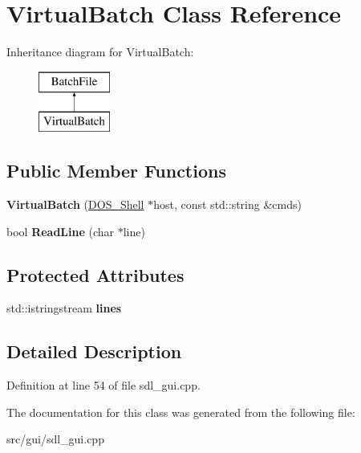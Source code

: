 \hypertarget{classVirtualBatch}{\section{Virtual\-Batch Class Reference}
\label{classVirtualBatch}
}
Inheritance diagram for Virtual\-Batch\-:\begin{figure}[H]
\begin{center}
\leavevmode
\includegraphics[height=2.000000cm]{classVirtualBatch}
\end{center}
\end{figure}
\subsection*{Public Member Functions}
\begin{DoxyCompactItemize}
\item 
\hypertarget{classVirtualBatch_ae7d064d0fd0b8ef53b344eb8239ec41f}{{\bfseries Virtual\-Batch} (\hyperlink{classDOS__Shell}{D\-O\-S\-\_\-\-Shell} $\ast$host, const std\-::string \&cmds)}\label{classVirtualBatch_ae7d064d0fd0b8ef53b344eb8239ec41f}

\item 
\hypertarget{classVirtualBatch_a2d5e383678a9a43bd5d0ac5753279fba}{bool {\bfseries Read\-Line} (char $\ast$line)}\label{classVirtualBatch_a2d5e383678a9a43bd5d0ac5753279fba}

\end{DoxyCompactItemize}
\subsection*{Protected Attributes}
\begin{DoxyCompactItemize}
\item 
\hypertarget{classVirtualBatch_ad920a5d596d8cc0372e8eb1e6512448e}{std\-::istringstream {\bfseries lines}}\label{classVirtualBatch_ad920a5d596d8cc0372e8eb1e6512448e}

\end{DoxyCompactItemize}


\subsection{Detailed Description}


Definition at line 54 of file sdl\-\_\-gui.\-cpp.



The documentation for this class was generated from the following file\-:\begin{DoxyCompactItemize}
\item 
src/gui/sdl\-\_\-gui.\-cpp\end{DoxyCompactItemize}
